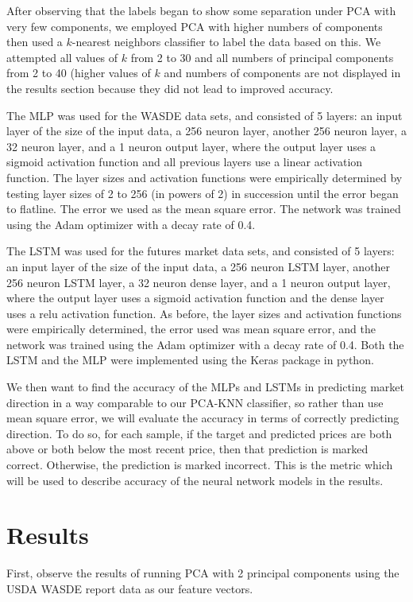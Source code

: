 \documentclass{article}
\begin{document}
After observing that the labels began to show some separation under PCA with very few components, we employed PCA with higher numbers of components then used a $k$-nearest neighbors classifier to label the data based on this.  
We attempted all values of $k$ from 2 to 30 and all numbers of principal components from 2 to 40 (higher values of $k$ and numbers of components are not displayed in the results section because they did not lead to improved accuracy.  

The MLP was used for the WASDE data sets, and consisted of 5 layers: an input layer of the size of the input data, a 256 neuron layer, another 256 neuron layer, a 32 neuron layer, and a 1 neuron output layer, where the output layer uses a sigmoid activation function and all previous layers use a linear activation function.  The layer sizes and activation functions were empirically determined by testing layer sizes of 2 to 256 (in powers of 2) in succession until the error began to flatline.  The error we used as the mean square error.  The network was trained using the Adam optimizer with a decay rate of 0.4.  

The LSTM was used for the futures market data sets, and consisted of 5 layers: an input layer of the size of the input data, a 256 neuron LSTM layer, another 256 neuron LSTM layer, a 32 neuron dense layer, and a 1 neuron output layer, where the output layer uses a sigmoid activation function and the dense layer uses a relu activation function.  As before, the layer sizes and activation functions were empirically determined, the error used was mean square error, and the network was trained using the Adam optimizer with a decay rate of 0.4.  Both the LSTM and the MLP were implemented using the Keras package in python.

We then want to find the accuracy of the MLPs and LSTMs in predicting market direction in a way comparable to our PCA-KNN classifier, so rather than use mean square error, we will evaluate the accuracy in terms of correctly predicting direction.  To do so, for each sample, if the target and predicted prices are both above or both below the most recent price, then that prediction is marked correct.  Otherwise, the prediction is marked incorrect.  This is the metric which will be used to describe accuracy of the neural network models in the results.


\section{Results}
First, observe the results of running PCA with 2 principal components using the USDA WASDE report data as our feature vectors.
\end{document}
